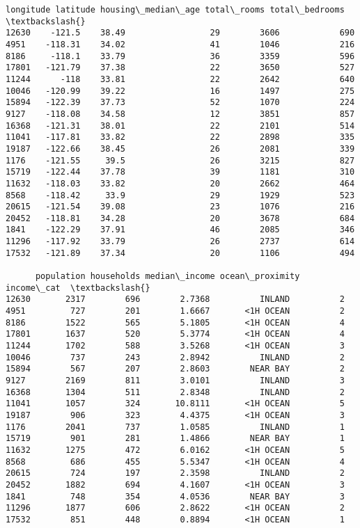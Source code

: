 \documentclass[11pt]{article}
\makeatletter
\newcommand{\boxspacing}{\kern\kvtcb@left@rule\kern\kvtcb@boxsep}
\newcommand{\prompt}[4]{
        \ttfamily\llap{{\color{#2}[#3]:\hspace{3pt}#4}}\vspace{-\baselineskip}
    }
\makeatother
\begin{document}
            \begin{tcolorbox}[breakable, size=fbox, boxrule=.5pt, pad at break*=1mm, opacityfill=0]
\prompt{Out}{outcolor}{71}{\boxspacing}
\begin{Verbatim}[commandchars=\\\{\}]
      longitude latitude housing\_median\_age total\_rooms total\_bedrooms  \textbackslash{}
12630    -121.5    38.49                 29        3606            690
4951    -118.31    34.02                 41        1046            216
8186     -118.1    33.79                 36        3359            596
17801   -121.79    37.38                 22        3650            527
11244      -118    33.81                 22        2642            640
10046   -120.99    39.22                 16        1497            275
15894   -122.39    37.73                 52        1070            224
9127    -118.08    34.58                 12        3851            857
16368   -121.31    38.01                 22        2101            514
11041   -117.81    33.82                 22        2898            335
19187   -122.66    38.45                 26        2081            339
1176    -121.55     39.5                 26        3215            827
15719   -122.44    37.78                 39        1181            310
11632   -118.03    33.82                 20        2662            464
8568    -118.42     33.9                 29        1929            523
20615   -121.54    39.08                 23        1076            216
20452   -118.81    34.28                 20        3678            684
1841    -122.29    37.91                 46        2085            346
11296   -117.92    33.79                 26        2737            614
17532   -121.89    37.34                 20        1106            494

      population households median\_income ocean\_proximity income\_cat  \textbackslash{}
12630       2317        696        2.7368          INLAND          2
4951         727        201        1.6667       <1H OCEAN          2
8186        1522        565        5.1805       <1H OCEAN          4
17801       1637        520        5.3774       <1H OCEAN          4
11244       1702        588        3.5268       <1H OCEAN          3
10046        737        243        2.8942          INLAND          2
15894        567        207        2.8603        NEAR BAY          2
9127        2169        811        3.0101          INLAND          3
16368       1304        511        2.8348          INLAND          2
11041       1057        324       10.8111       <1H OCEAN          5
19187        906        323        4.4375       <1H OCEAN          3
1176        2041        737        1.0585          INLAND          1
15719        901        281        1.4866        NEAR BAY          1
11632       1275        472        6.0162       <1H OCEAN          5
8568         686        455        5.5347       <1H OCEAN          4
20615        724        197        2.3598          INLAND          2
20452       1882        694        4.1607       <1H OCEAN          3
1841         748        354        4.0536        NEAR BAY          3
11296       1877        606        2.8622       <1H OCEAN          2
17532        851        448        0.8894       <1H OCEAN          1


\end{Verbatim}
\end{tcolorbox}
\end{document}
